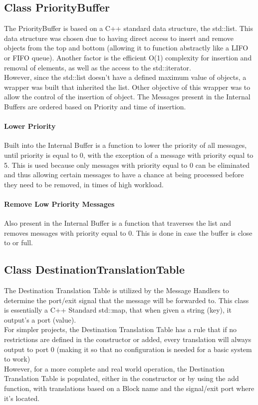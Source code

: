 \begin{refsection}
\subsection{Class PriorityBuffer}
\label{lib:prioritybuffer}
The PriorityBuffer is based on a C++ standard data structure, the std::list. 
This data structure was chosen due to having direct access to insert and 
remove objects from the top and bottom (allowing it to function abstractly 
like a LIFO or FIFO queue). Another factor is the efficient O(1) complexity 
for insertion and removal of elements, as well as the access to the 
std::iterator.
\\
However, since the std::list doesn't have a defined maximum value of objects, 
a wrapper was built that inherited the list. Other objective of this wrapper 
was to allow the control of the insertion of object. The Messages present in 
the Internal Buffers are ordered based on Priority and time of insertion.
\\
\paragraph{Lower Priority}
Built into the Internal Buffer is a function to lower the priority of all 
messages, until priority is equal to 0, with the exception of a message with 
priority equal to 5. This is used because only messages with priority equal 
to 0 can be eliminated and thus allowing certain messages to have a chance 
at being processed before they need to be removed, in times of high workload.
\\
\paragraph{Remove Low Priority Messages}
Also present in the Internal Buffer is a function that traverses the list and 
removes messages with priority equal to 0. This is done in case the buffer is 
close to or full.

\subsection{Class DestinationTranslationTable}
\label{lib:destinationtranslationtable}
The Destination Translation Table is utilized by the Message Handlers to 
determine the port/exit signal that the message will be forwarded to. This 
class is essentially a C++ Standard std::map, that when given a string (key), 
it output's a port (value).
\\
For simpler projects, the Destination Translation Table has a rule that if no 
restrictions are defined in the constructor or added, every translation will 
always output to port 0 (making it so that no configuration is needed for a 
basic system to work)
\\
However, for a more complete and real world operation, the Destination 
Translation Table is populated, either in the constructor or by using the add 
function, with translations based on a Block name and the signal/exit port 
where it's located.


\end{refsection}
